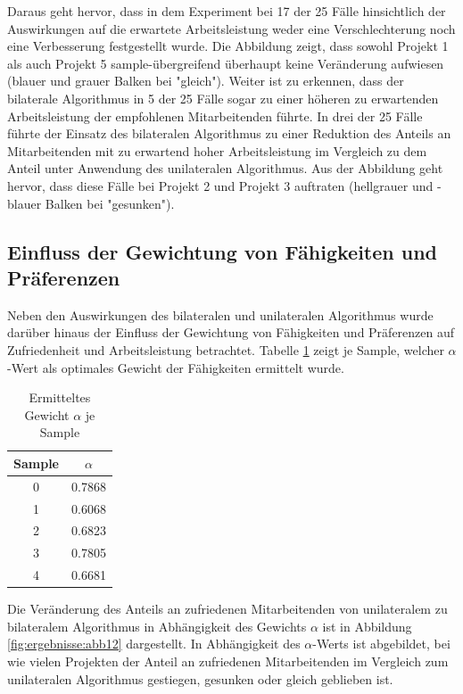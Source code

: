 Daraus geht hervor, dass in dem Experiment bei 17 der 25 Fälle hinsichtlich der Auswirkungen auf die erwartete Arbeitsleistung weder eine Verschlechterung noch eine Verbesserung festgestellt wurde.
Die Abbildung zeigt, dass sowohl Projekt 1 als auch Projekt 5 sample-übergreifend überhaupt keine Veränderung aufwiesen (blauer und grauer Balken bei "gleich").
Weiter ist zu erkennen, dass der bilaterale Algorithmus in 5 der 25 Fälle sogar zu einer höheren zu erwartenden Arbeitsleistung der empfohlenen Mitarbeitenden führte. 
In drei der 25 Fälle führte der Einsatz des bilateralen Algorithmus zu einer Reduktion des Anteils an Mitarbeitenden mit zu erwartend hoher Arbeitsleistung im Vergleich zu dem Anteil unter Anwendung des unilateralen Algorithmus.
Aus der Abbildung geht hervor, dass diese Fälle bei Projekt 2 und Projekt 3 auftraten (hellgrauer und -blauer Balken bei "gesunken").

\subsection{Einfluss der Gewichtung von Fähigkeiten und Präferenzen}
Neben den Auswirkungen des bilateralen und unilateralen Algorithmus wurde darüber hinaus der Einfluss der Gewichtung von Fähigkeiten und Präferenzen auf Zufriedenheit und Arbeitsleistung betrachtet.
Tabelle \ref{tab:ergebnisse:tab1} zeigt je Sample, welcher $\alpha$-Wert als optimales Gewicht der Fähigkeiten ermittelt wurde.

\begin{table}[htbp]
    \begin{center}
    \begin{tabular}{c|c}
    {\textbf{Sample}} & {\boldmath$\alpha$}\\
    \hline
    0 & 0.7868 \\
    \hline
	1 & 0.6068 \\
    \hline
    2 & 0.6823 \\
    \hline
	3 & 0.7805 \\
    \hline
	4 & 0.6681 \\
    \end{tabular}
    \end{center}
    \caption[Ermitteltes Gewicht $\alpha$ je Sample]{Ermitteltes Gewicht $\alpha$ je Sample}
	\label{tab:ergebnisse:tab1}
\end{table}

Die Veränderung des Anteils an zufriedenen Mitarbeitenden von unilateralem zu bilateralem Algorithmus in Abhängigkeit des Gewichts $\alpha$ ist in Abbildung \ref{fig:ergebnisse:abb12} dargestellt.
In Abhängigkeit des $\alpha$-Werts ist abgebildet, bei wie vielen Projekten der Anteil an zufriedenen Mitarbeitenden im Vergleich zum unilateralen Algorithmus gestiegen, gesunken oder gleich geblieben ist.

